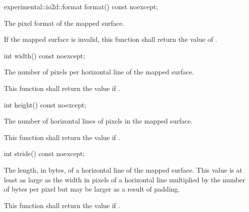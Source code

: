 \begin{itemdecl}
    experimental::io2d::format format() const noexcept;
\end{itemdecl}
\begin{itemdescr}
	\pnum
	\returns
	The pixel format of the mapped surface.
	
	\pnum
	\remarks
	If the mapped surface is invalid, this function shall return the value of .
	
\end{itemdescr}

\begin{itemdecl}
    int width() const noexcept;
\end{itemdecl}
\begin{itemdescr}
	\pnum
	\returns
	The number of pixels per horizontal line of the mapped surface.
	
	\pnum
	\remarks
	This function shall return the value  if .
	
\end{itemdescr}

\begin{itemdecl}
    int height() const noexcept;
\end{itemdecl}
\begin{itemdescr}
	\pnum
	\returns
	The number of horizontal lines of pixels in the mapped surface.
	
	\pnum
	\remarks
	This function shall return the value  if .
	
\end{itemdescr}

\begin{itemdecl}
    int stride() const noexcept;
\end{itemdecl}
\begin{itemdescr}
	\pnum
	\returns
	The length, in bytes, of a horizontal line of the mapped surface. This value is at least as large as the width in pixels of a horizontal line multiplied by the number of bytes per pixel but may be larger as a result of padding.
	
	\pnum
	\remarks
	This function shall return the value  if .
	
\end{itemdescr}

